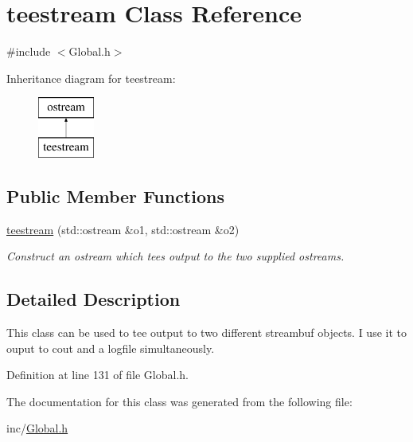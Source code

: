 \hypertarget{classteestream}{\section{teestream Class Reference}
\label{classteestream}
}


{\ttfamily \#include $<$Global.\-h$>$}

Inheritance diagram for teestream\-:\begin{figure}[H]
\begin{center}
\leavevmode
\includegraphics[height=2.000000cm]{classteestream}
\end{center}
\end{figure}
\subsection*{Public Member Functions}
\begin{DoxyCompactItemize}
\item 
\hypertarget{classteestream_aa7289fc026f510120ce669da5ad6b92e}{\hyperlink{classteestream_aa7289fc026f510120ce669da5ad6b92e}{teestream} (std\-::ostream \&o1, std\-::ostream \&o2)}\label{classteestream_aa7289fc026f510120ce669da5ad6b92e}

\begin{DoxyCompactList}\small\item\em Construct an ostream which tees output to the two supplied ostreams. \end{DoxyCompactList}\end{DoxyCompactItemize}


\subsection{Detailed Description}
This class can be used to tee output to two different streambuf objects. I use it to ouput to cout and a logfile simultaneously. 

Definition at line 131 of file Global.\-h.



The documentation for this class was generated from the following file\-:\begin{DoxyCompactItemize}
\item 
inc/\hyperlink{Global_8h}{Global.\-h}\end{DoxyCompactItemize}

